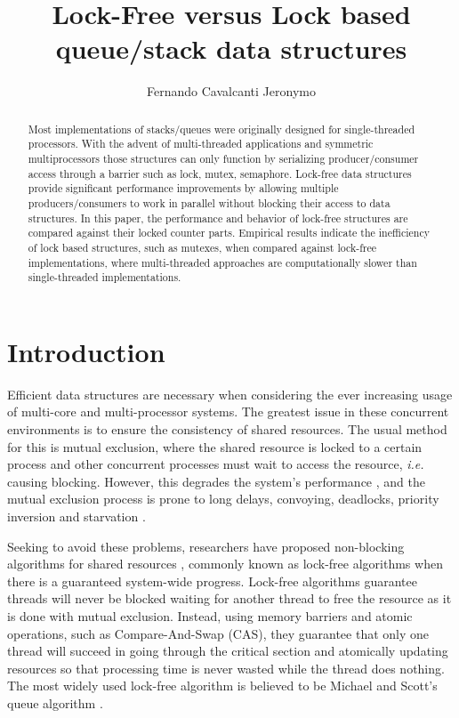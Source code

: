 \documentclass{article}
\title{Lock-Free versus Lock based queue/stack data structures}
\author{Fernando Cavalcanti Jeronymo}
\begin{document}
\maketitle

\begin{abstract}
Most implementations of stacks/queues were originally designed for single-threaded processors. With the advent of multi-threaded applications and symmetric multiprocessors those structures can only function by serializing producer/consumer access through a barrier such as lock, mutex, semaphore. Lock-free data structures provide significant performance improvements by allowing multiple producers/consumers to work in parallel without blocking their access to data structures. In this paper, the performance and behavior of lock-free structures are compared against their locked counter parts. Empirical results indicate the inefficiency of lock based structures, such as mutexes, when compared against lock-free implementations, where multi-threaded approaches are computationally slower than single-threaded implementations.
\end{abstract}

\section{Introduction}

Efficient data structures are necessary when considering the ever increasing usage of multi-core and multi-processor systems. The greatest issue in these concurrent environments is to ensure the consistency of shared resources. The usual method for this is mutual exclusion, where the shared resource is locked to a certain process and other concurrent processes must wait to access the resource, \textit{i.e.} causing blocking. However, this degrades the system's performance \cite{Silberschatz08}, and the mutual exclusion process is prone to long delays, convoying, deadlocks, priority inversion and starvation \cite{Sundell08, Gao07}.

Seeking to avoid these problems, researchers have proposed non-blocking algorithms for shared resources \cite{Herlihy91}, commonly known as lock-free algorithms when there is a guaranteed system-wide progress. Lock-free algorithms guarantee threads will never be blocked waiting for another thread to free the resource as it is done with mutual exclusion. Instead, using memory barriers and atomic operations, such as Compare-And-Swap (CAS), they guarantee that only one thread will succeed in going through the critical section and atomically updating resources so that processing time is never wasted while the thread does nothing. The most widely used lock-free algorithm is believed \cite{Lindsay08} to be Michael and Scott's queue algorithm \cite{Michael98}.
\end{document}
